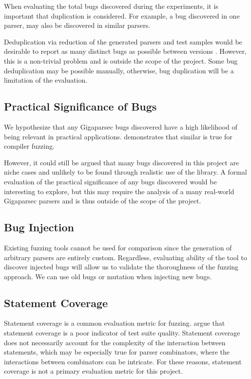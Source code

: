 \documentclass[11pt]{article}
\let\oldciteauthor\citeauthor
\renewcommand{\citeauthor}[1]{\oldciteauthor{#1} \cite{#1}}
\begin{document}
When evaluating the total bugs discovered during the experiments, it is important that duplication is considered. For example, a bug discovered in one parser, may also be discovered in similar parsers.

Deduplication via reduction of the generated parsers and test samples would be desirable to report as many distinct bugs as possible between versions \cite{deduplication}. However, this is a non-trivial problem and is outside the scope of the project. Some bug deduplication may be possible manually, otherwise, bug duplication will be a limitation of the evaluation.

\subsection{Practical Significance of Bugs}

We hypothesize that any Gigaparsec bugs discovered have a high likelihood of being relevant in practical applications. \citeauthor{fuzzing-importance} demonstrates that similar is true for compiler fuzzing.

However, it could still be argued that many bugs discovered in this project are niche cases and unlikely to be found through realistic use of the library. A formal evaluation of the practical significance of any bugs discovered would be interesting to explore, but this may require the analysis of a many real-world Gigaparsec parsers and is thus outside of the scope of the project.

\subsection{Bug Injection}

Existing fuzzing tools cannot be used for comparison since the generation of arbitrary parsers are entirely custom. Regardless, evaluating ability of the tool to discover injected bugs will allow us to validate the thoroughness of the fuzzing approach. We can use old bugs or mutation when injecting new bugs.

\subsection{Statement Coverage}

Statement coverage is a common evaluation metric for fuzzing. \citeauthor{coverage} argue that statement coverage is a poor indicator of test suite quality. Statement coverage does not necessarily account for the complexity of the interaction between statements, which may be especially true for parser combinators, where the interactions between combinators can be intricate. For these reasons, statement coverage is not a primary evaluation metric for this project.
\end{document}
